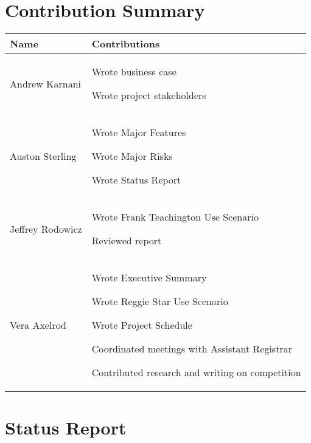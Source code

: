 \documentclass[11pt]{article}
\newenvironment{packed_itemize}{
\begin{itemize}
  \setlength{\itemsep}{1pt}
  \setlength{\parskip}{0pt}
  \setlength{\parsep}{0pt}
}{\end{itemize}}
\begin{document}
\section{Contribution Summary} %
\begin{tabular}{|m{1.4in}|m{4in}|}
\hline
\textbf{\large Name}     & \textbf{\large Contributions} \\
\hline\hline
 Andrew Karnani
	&
	 \begin{packed_itemize}
		\item Wrote business case
    \item Wrote project stakeholders
	\end{packed_itemize}
\\
\hline
 Auston Sterling
	&
	 \begin{packed_itemize}
	        \item Wrote Major Features
                \item Wrote Major Risks
                \item Wrote Status Report
	\end{packed_itemize}
\\
\hline
Jeffrey Rodowicz
	&
	 \begin{packed_itemize}
		\item Wrote Frank Teachington Use Scenario
		\item Reviewed report
	\end{packed_itemize}
\\
\hline
Vera Axelrod
	&
	 \begin{packed_itemize}
		\item Wrote Executive Summary
		\item Wrote Reggie Star Use Scenario
		\item Wrote Project Schedule
		\item Coordinated meetings with Assistant Registrar
		\item Contributed research and writing on competition
	\end{packed_itemize}
\\
\hline
\end{tabular}


\section{Status Report} %
\end{document}
